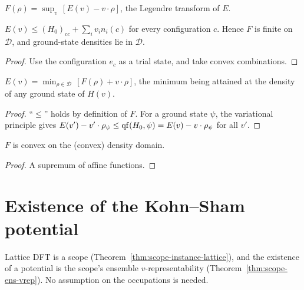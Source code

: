 \begin{definition}
  \label{def:lieb}
  \leanok
  $F(\rho)=\sup_v\,[E(v)-v\cdot\rho]$, the Legendre transform of $E$.
\end{definition}

\begin{lemma}
  \label{lem:lieb_basic}
  \leanok
  $E(v)\le (H_0)_{cc}+\sum_iv_in_i(c)$ for every configuration $c$. Hence $F$ is finite on $\mathcal{D}$, and
  ground-state densities lie in $\mathcal{D}$.
\end{lemma}
\begin{proof}
  \leanok
  Use the configuration $e_c$ as a trial state, and take convex combinations.
\end{proof}

\begin{theorem}
  \label{thm:lieb_duality}
  \leanok
  $E(v)=\min_{\rho\in\mathcal{D}}\,[F(\rho)+v\cdot\rho]$, the minimum being attained at the density of any
  ground state of $H(v)$.
\end{theorem}
\begin{proof}
  \leanok
  ``$\le$'' holds by definition of $F$. For a ground state $\psi$, the variational principle gives
  $E(v')-v'\cdot\rho_\psi\le\operatorname{qf}(H_0,\psi)=E(v)-v\cdot\rho_\psi$ for all $v'$.
\end{proof}

\begin{theorem}[Convexity]
  \label{thm:lieb_convexOn}
  \leanok
  $F$ is convex on the (convex) density domain.
\end{theorem}
\begin{proof}
  \leanok
  A supremum of affine functions.
\end{proof}

\section{Existence of the Kohn--Sham potential}

Lattice DFT is a scope (Theorem~\ref{thm:scope-instance-lattice}), and the existence of a potential is the scope's ensemble
$v$-representability (Theorem~\ref{thm:scope-ens-vrep}). No assumption on the occupations is needed.

